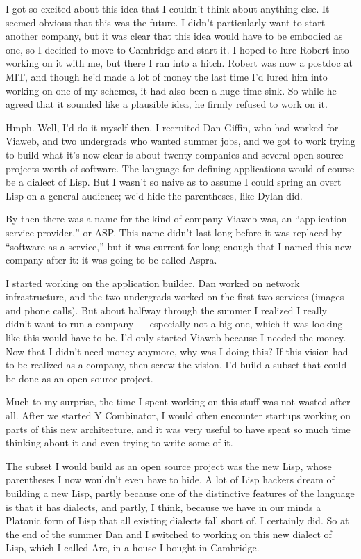 I got so excited about this idea that I couldn't think about anything
else. It seemed obvious that this was the future. I didn't particularly
want to start another company, but it was clear that this idea would
have to be embodied as one, so I decided to move to Cambridge and start
it. I hoped to lure Robert into working on it with me, but there I ran
into a hitch. Robert was now a postdoc at MIT, and though he'd made a
lot of money the last time I'd lured him into working on one of my
schemes, it had also been a huge time sink. So while he agreed that it
sounded like a plausible idea, he firmly refused to work on it.

Hmph. Well, I'd do it myself then. I recruited Dan Giffin, who had
worked for Viaweb, and two undergrads who wanted summer jobs, and we got
to work trying to build what it's now clear is about twenty companies
and several open source projects worth of software. The language for
defining applications would of course be a dialect of Lisp. But I wasn't
so naive as to assume I could spring an overt Lisp on a general
audience; we'd hide the parentheses, like Dylan did.

By then there was a name for the kind of company Viaweb was, an
``application service provider,'' or ASP. This name didn't last long
before it was replaced by ``software as a service,'' but it was current
for long enough that I named this new company after it: it was going to
be called Aspra.

I started working on the application builder, Dan worked on network
infrastructure, and the two undergrads worked on the first two services
(images and phone calls). But about halfway through the summer I
realized I really didn't want to run a company --- especially not a big
one, which it was looking like this would have to be. I'd only started
Viaweb because I needed the money. Now that I didn't need money anymore,
why was I doing this? If this vision had to be realized as a company,
then screw the vision. I'd build a subset that could be done as an open
source project.

Much to my surprise, the time I spent working on this stuff was not
wasted after all. After we started Y Combinator, I would often encounter
startups working on parts of this new architecture, and it was very
useful to have spent so much time thinking about it and even trying to
write some of it.

The subset I would build as an open source project was the new Lisp,
whose parentheses I now wouldn't even have to hide. A lot of Lisp
hackers dream of building a new Lisp, partly because one of the
distinctive features of the language is that it has dialects, and
partly, I think, because we have in our minds a Platonic form of Lisp
that all existing dialects fall short of. I certainly did. So at the end
of the summer Dan and I switched to working on this new dialect of Lisp,
which I called Arc, in a house I bought in Cambridge.

